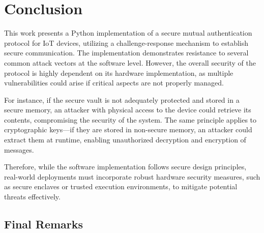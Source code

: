 \documentclass[10pt,twocolumn,letterpaper]{article}
\begin{document}
\section{Conclusion}
This work presents a Python implementation of a secure mutual authentication protocol for IoT devices, utilizing a challenge-response mechanism to establish secure communication. The implementation demonstrates resistance to several common attack vectors at the software level. However, the overall security of the protocol is highly dependent on its hardware implementation, as multiple vulnerabilities could arise if critical aspects are not properly managed.

For instance, if the secure vault is not adequately protected and stored in a secure memory, an attacker with physical access to the device could retrieve its contents, compromising the security of the system. The same principle applies to cryptographic keys—if they are stored in non-secure memory, an attacker could extract them at runtime, enabling unauthorized decryption and encryption of messages.

Therefore, while the software implementation follows secure design principles, real-world deployments must incorporate robust hardware security measures, such as secure enclaves or trusted execution environments, to mitigate potential threats effectively.
\subsection{Final Remarks}

{\small
    
    
}
\end{document}
